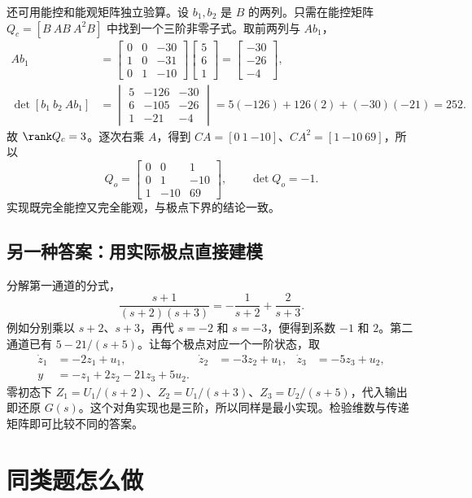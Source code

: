 还可用能控和能观矩阵独立验算。设 $b_1,b_2$ 是 $B$ 的两列。只需在能控矩阵 $Q_c=[B\ AB\ A^2B]$ 中找到一个三阶非零子式。取前两列与 $Ab_1$，
\[
\begin{aligned}
    Ab_1&=
    \begin{bmatrix}0&0&-30\\1&0&-31\\0&1&-10\end{bmatrix}
    \begin{bmatrix}5\\6\\1\end{bmatrix}
    =\begin{bmatrix}-30\\-26\\-4\end{bmatrix},\\
    \det[b_1\ b_2\ Ab_1]&=
    \begin{vmatrix}5&-126&-30\\6&-105&-26\\1&-21&-4\end{vmatrix}
    =5(-126)+126(2)+(-30)(-21)=252 .
\end{aligned}
\]
故 $\rank Q_c=3$。逐次右乘 $A$，得到 $CA=[0\ 1\ {-10}]$、$CA^2=[1\ {-10}\ 69]$，所以
\[
    Q_o=\begin{bmatrix}0&0&1\\0&1&-10\\1&-10&69\end{bmatrix},
    \qquad \det Q_o=-1 .
\]
实现既完全能控又完全能观，与极点下界的结论一致。

\subsection{另一种答案：用实际极点直接建模}

分解第一通道的分式，
\[
  \frac{s+1}{(s+2)(s+3)}=-\frac{1}{s+2}+\frac{2}{s+3}.
\]
例如分别乘以 $s+2$、$s+3$，再代 $s=-2$ 和 $s=-3$，便得到系数 $-1$ 和 $2$。第二通道已有 $5-21/(s+5)$。让每个极点对应一个一阶状态，取
\[
\begin{aligned}
   \dot z_1&=-2z_1+u_1,&
   \dot z_2&=-3z_2+u_1,&
   \dot z_3&=-5z_3+u_2,\\
   y&=-z_1+2z_2-21z_3+5u_2 . &&
\end{aligned}
\]
零初态下 $Z_1=U_1/(s+2)$、$Z_2=U_1/(s+3)$、$Z_3=U_2/(s+5)$，代入输出即还原 $G(s)$。这个对角实现也是三阶，所以同样是最小实现。检验维数与传递矩阵即可比较不同的答案。

\section{同类题怎么做}


